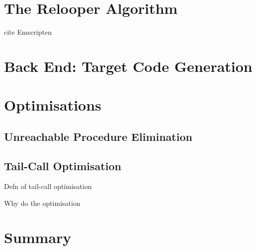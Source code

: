 \documentclass[00-main.tex]{subfiles}
\begin{document}
\section{The Relooper Algorithm}

\begin{Comment}
cite Emscripten \cite{emscripten}
\end{Comment}

\section{Back End: Target Code Generation}


\section{Optimisations}

\subsection{Unreachable Procedure Elimination}

\subsection{Tail-Call Optimisation}

\begin{Comment}
Defn of tail-call optimisation

Why do the optimisation
\end{Comment}

\section{Summary}
\end{document}
